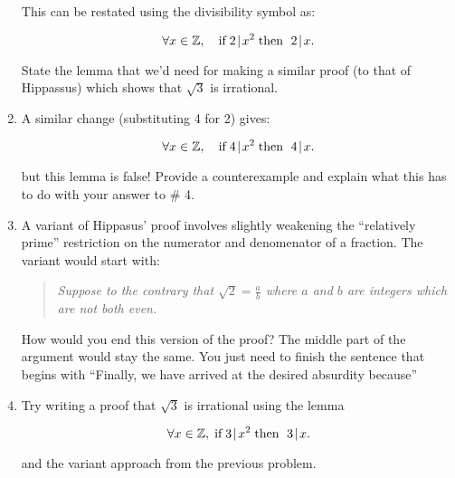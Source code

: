\documentclass{amsart}
\begin{document}
\begin{enumerate}
This can be restated using the divisibility symbol as:

\[ \forall x \in {\mathbb Z}, \quad \mbox{if} \; 2 \!\mid\! x^2 \; \mbox{then } \; 2\!\mid\! x. \]

State the lemma that we'd need for making a similar proof (to that of Hippassus) which shows that  $\sqrt{3}$ is irrational.

\vfill

\item A similar change (substituting 4 for 2) gives:

\[ \forall x \in {\mathbb Z}, \quad \mbox{if} \; 4 \!\mid\! x^2 \; \mbox{then } \; 4\!\mid\! x. \]

\noindent but this lemma is false!  Provide a counterexample and explain what this has to do with your answer to \# 4.

\vfill

\newpage

\item A variant of Hippasus' proof involves slightly weakening the ``relatively prime'' restriction on the numerator and denomenator of a fraction.  The variant would start with:

\begin{quote} 
{\em Suppose to the contrary that $\displaystyle \sqrt{2} = \frac{a}{b}$ where $a$ and $b$ are integers which are not both even.}
\end{quote}

How would you end this version of the proof? The middle part of the argument would stay the same. You just need to finish the sentence that begins with ``Finally, we have arrived at the desired absurdity because\textellipsis''

\vfill

\item Try writing a proof that $\sqrt{3}$ is irrational using the lemma 

\[ \forall x \in {\mathbb Z}, \; \mbox{if} \; 3 \!\mid\! x^2 \; \mbox{then } \; 3 \!\mid\! x. \]

\noindent and the variant approach from the previous problem.

\vfill



\end{enumerate}
\end{document}
